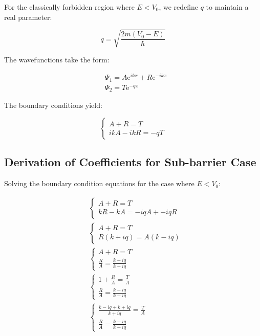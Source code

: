 \documentclass[italian]{HKNdocument}
\begin{document}
For the classically forbidden region where $E<V_{0}$, we redefine $q$ to maintain a real parameter:

\begin{equation}
q=\sqrt{\frac{2 m\left(V_{0}-E\right)}{\hbar}} \label{eq:6.37}
\end{equation}

The wavefunctions take the form:

\begin{align}
& \Psi_{1}=A \mathrm{e}^{i k x}+R \mathrm{e}^{-i k x} \\
& \Psi_{2}=T \mathrm{e}^{-q x} \label{eq:6.38}
\end{align}

The boundary conditions yield:

\[
\left\{\begin{array}{l}
A+R=T  \label{eq:6.39}\\
i k A-i k R=-q T
\end{array}\right.
\]


\subsection{Derivation of Coefficients for Sub-barrier Case}

Solving the boundary condition equations for the case where $E<V_0$:

\begin{align}
& \left\{\begin{array}{l}
A+R=T \\
k R-k A=-i q A+-i q R
\end{array}\right. \\
& \left\{\begin{array}{l}
A+R=T \\
R(k+i q)=A(k-i q)
\end{array}\right. \\
& \left\{\begin{array}{l}
A+R=T \\
\frac{R}{A}=\frac{k-i q}{k+i q}
\end{array}\right.  \label{eq:6.40}\\
& \left\{\begin{array}{l}
1+\frac{R}{A}=\frac{T}{A} \\
\frac{R}{A}=\frac{k-i q}{k+i q}
\end{array}\right. \\
& \left\{\begin{array}{l}
\frac{k-i q+k+i q}{k+i q}=\frac{T}{A} \\
\frac{R}{A}=\frac{k-i q}{k+i q}
\end{array}\right.
\end{align}
\end{document}
